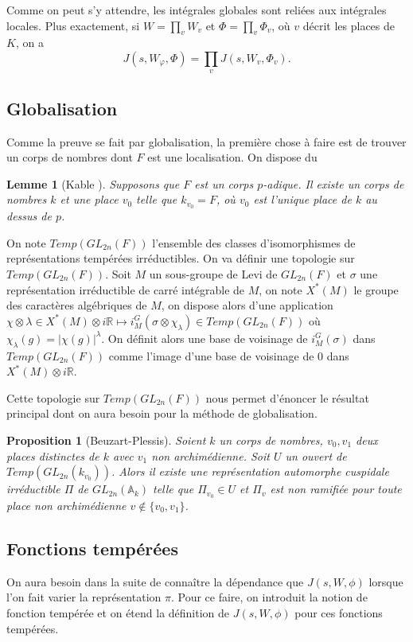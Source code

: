 \documentclass{amsart}
\newtheorem{proposition}{Proposition}[section]
\newtheorem{lemme}{Lemme}[section]
\begin{document}
 Comme on peut s'y attendre, les intégrales globales sont reliées aux intégrales locales. Plus exactement, si $W=\prod_v W_v$ et $\Phi = \prod_v \Phi_v$, où $v$ décrit les places de $K$, on a
 \begin{equation}
 J(s,W_\varphi,\Phi)=\prod_v J(s, W_v, \Phi_v).
 \end{equation}
 
 \subsection{Globalisation}
 
 Comme la preuve se fait par globalisation, la première chose à faire est de trouver un corps de nombres dont $F$ est une localisation. On dispose du
 \begin{lemme}[Kable \cite{kable}]
 \label{corpsglobal}
 Supposons que $F$ est un corps $p$-adique. Il existe un corps de nombres $k$ et une place $v_0$ telle que $k_{v_0} = F$, où $v_0$ est l'unique place de $k$ au dessus de $p$.
 \end{lemme}
 
 On note $Temp(GL_{2n}(F))$ l'ensemble des classes d'isomorphismes de représentations tempérées irréductibles. On va définir une topologie sur $Temp(GL_{2n}(F))$. Soit $M$ un sous-groupe de Levi de $GL_{2n}(F)$ et $\sigma$ une représentation irréductible de carré intégrable de $M$, on note $X^*(M)$ le groupe des caractères algébriques de $M$, on dispose alors d'une application $\chi \otimes \lambda \in X^*(M) \otimes i\mathbb{R} \mapsto i^G_M(\sigma \otimes \chi_\lambda) \in Temp(GL_{2n}(F))$ où $\chi_\lambda(g) = |\chi(g)|^\lambda$. On définit alors une base de voisinage de $i^G_M(\sigma)$ dans $Temp(GL_{2n}(F))$ comme l'image d'une base de voisinage de $0$ dans $X^*(M) \otimes i\mathbb{R}$.
 
 Cette topologie sur $Temp(GL_{2n}(F))$ nous permet d'énoncer le résultat principal dont on aura besoin pour la méthode de globalisation.
 \begin{proposition}[Beuzart-Plessis]
 \label{globalisation}
 Soient $k$ un corps de nombres, $v_0,v_1$ deux places distinctes de $k$ avec $v_1$ non archimédienne. Soit $U$ un ouvert de $Temp(GL_{2n}(k_{v_0}))$. Alors il existe une représentation automorphe cuspidale irréductible $\Pi$ de $GL_{2n}(\mathbb{A}_k)$ telle que $\Pi_{v_0} \in U$ et $\Pi_v$ est non ramifiée pour toute place non archimédienne $v \not \in \{v_0,v_1\}$.
 \end{proposition}
 
 \subsection{Fonctions tempérées}
 On aura besoin dans la suite de connaître la dépendance que $J(s, W, \phi)$ lorsque l'on fait varier la représentation $\pi$. Pour ce faire, on introduit la notion de fonction tempérée et on étend la définition de $J(s,W,\phi)$ pour ces fonctions tempérées.
 
\end{document}
